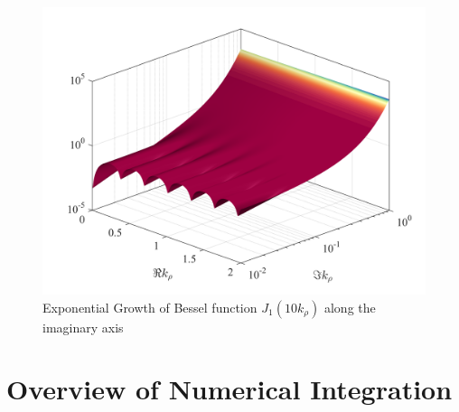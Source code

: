 \documentclass[11pt]{article}
\newcommand{\p}{\rho}  %
\renewcommand{\^}{\hat}  %
\begin{document}
\begin{figure}[h!]
  \centering
  \includegraphics[width=\textwidth]{figures/J_1_comp.png}
  \caption{Exponential Growth of Bessel function $J_1(10 k_{\p})$ along the imaginary axis}
  \label{fig:bessel}
\end{figure}

\section{Overview of Numerical Integration}




  \clearpage %
  
  
\end{document}
